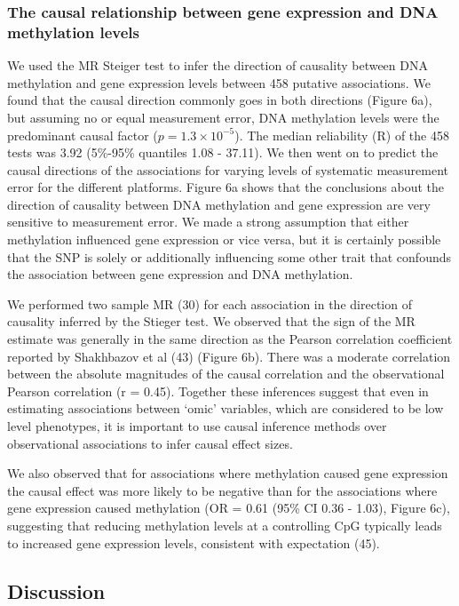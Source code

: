 \documentclass[]{article}
\begin{document}
\subsubsection{The causal relationship between gene expression and DNA
methylation
levels}\label{the-causal-relationship-between-gene-expression-and-dna-methylation-levels}

We used the MR Steiger test to infer the direction of causality between
DNA methylation and gene expression levels between 458 putative
associations. We found that the causal direction commonly goes in both
directions (Figure 6a), but assuming no or equal measurement error, DNA
methylation levels were the predominant causal factor
(\(p = 1.3\times 10^{-5}\)). The median reliability (R) of the 458 tests
was 3.92 (5\%-95\% quantiles 1.08 - 37.11). We then went on to predict
the causal directions of the associations for varying levels of
systematic measurement error for the different platforms. Figure 6a
shows that the conclusions about the direction of causality between DNA
methylation and gene expression are very sensitive to measurement error.
We made a strong assumption that either methylation influenced gene
expression or vice versa, but it is certainly possible that the SNP is
solely or additionally influencing some other trait that confounds the
association between gene expression and DNA methylation.

We performed two sample MR (30) for each association in the direction of
causality inferred by the Stieger test. We observed that the sign of the
MR estimate was generally in the same direction as the Pearson
correlation coefficient reported by Shakhbazov et al (43) (Figure 6b).
There was a moderate correlation between the absolute magnitudes of the
causal correlation and the observational Pearson correlation (r = 0.45).
Together these inferences suggest that even in estimating associations
between `omic' variables, which are considered to be low level
phenotypes, it is important to use causal inference methods over
observational associations to infer causal effect sizes.

We also observed that for associations where methylation caused gene
expression the causal effect was more likely to be negative than for the
associations where gene expression caused methylation (OR = 0.61 (95\%
CI 0.36 - 1.03), Figure 6c), suggesting that reducing methylation levels
at a controlling CpG typically leads to increased gene expression
levels, consistent with expectation (45).

\subsection{Discussion}\label{discussion}
\end{document}
